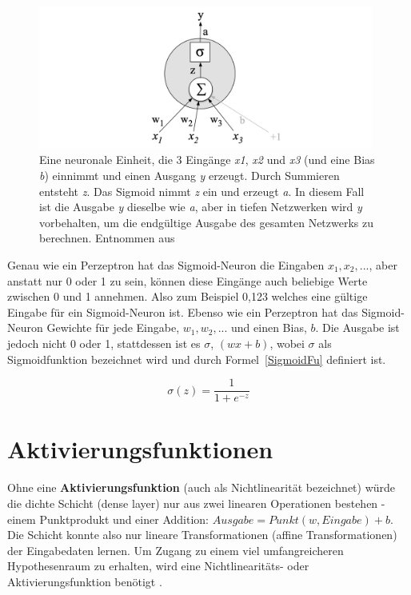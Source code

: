 \begin{figure}[H]
    \centering
    \includegraphics[width=11cm]{kapitel2/neuron.png}
    \caption[Eine neuronale Einheit]{Eine neuronale Einheit, die 3 Eingänge \textit{x1}, \textit{x2} und \textit{x3} (und eine Bias \textit{b}) einnimmt und einen Ausgang \textit{y} erzeugt. Durch Summieren entsteht \textit{z}. Das Sigmoid nimmt \textit{z} ein und erzeugt \textit{a}. In diesem Fall ist die Ausgabe \textit{y} dieselbe wie \textit{a}, aber in tiefen Netzwerken wird \textit{y} vorbehalten, um die endgültige Ausgabe des gesamten Netzwerks zu berechnen. Entnommen aus \cite[125]{Jurafskya}}
    \label{neurch2}
\end{figure}


Genau wie ein Perzeptron hat das Sigmoid-Neuron die Eingaben $x_1, x_2, ...$, aber anstatt nur 0 oder 1 zu sein, können diese Eingänge auch beliebige Werte zwischen 0 und 1 annehmen. Also zum Beispiel 0,123 welches eine gültige Eingabe für ein Sigmoid-Neuron ist. Ebenso wie ein Perzeptron hat das Sigmoid-Neuron Gewichte für jede Eingabe, $w_1, w_2, ...$ und einen Bias, $b$. Die Ausgabe ist jedoch nicht 0 oder 1, stattdessen ist es $\sigma$, $(wx + b)$, wobei $\sigma$ als Sigmoidfunktion bezeichnet wird und durch Formel~\ref{SigmoidFu} definiert ist.

\begin{equation} \label{SigmoidFu}
    \sigma (z) = \frac{1}{1+e^{-z}}
\end{equation}



\section{Aktivierungsfunktionen}
Ohne eine \textbf{Aktivierungsfunktion} (auch als Nichtlinearität bezeichnet) würde die dichte Schicht (dense layer) nur aus zwei linearen Operationen bestehen - einem Punktprodukt und einer Addition: $Ausgabe = Punkt (w, Eingabe) + b$. Die Schicht konnte also nur lineare Transformationen (affine Transformationen) der Eingabedaten lernen. Um Zugang zu einem viel umfangreicheren Hypothesenraum zu erhalten, wird eine Nichtlinearitäts- oder Aktivierungsfunktion benötigt \cite*[S. 72]{Chollet2017}.

